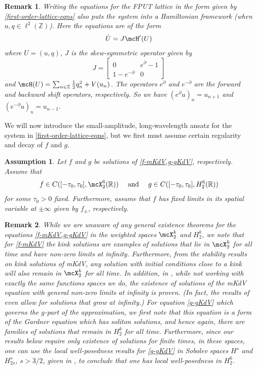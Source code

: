 \documentclass[oneside,reqno]{amsart}
\newcommand{\Z}{\mathbb{Z}}
\newcommand{\R}{\mathbb{R}}
\newtheorem{assum}{Assumption}
\newtheorem{rem}{Remark}
\begin{document}
\begin{rem}
	Writing the equations for the FPUT lattice in the form given by \cref{first-order-lattice-eqns} also puts the system into a Hamiltonian framework (when \(u, q\in\ell^2(\Z)\)). Here the equations are of the form
	\begin{equation*}
		\dot U = J \mcH'(U)
	\end{equation*}
	where \(U = (u,q)\), \(J\) is the skew-symmetric operator given by
	\begin{equation*}
		J = \begin{bmatrix}
			0 & e^\partial - 1 \\ 1 - e^{-\partial} & 0
		\end{bmatrix}
	\end{equation*}
	and \(\mcH(U) = \sum_{n\in\Z} \frac 1 2 q_n^2 + V(u_n)\). The operators \(e^\partial\) and \(e^{-\partial}\) are the forward and backward shift operators, respectively. So we have \((e^\partial u)_n = u_{n+1}\) and \((e^{-\partial}u)_n = u_{n-1}\).
\end{rem}

We will now introduce the small-amplitude, long-wavelength ansatz for the system in \cref{first-order-lattice-eqns}, but we first must assume certain regularity and decay of \(f\) and \(g\).
\begin{assum}\label{assumption-1}
	Let \(f\) and \(g\) be solutions of \cref{f-mKdV,g-gKdV}, respectively. Assume that \[f\in C([-\tau_0, \tau_0], \mcX_2^6(\R)) \quad \text{ and } \quad g\in C([-\tau_0,\tau_0],H_2^6(\R))\] for some \(\tau_0>0\) fixed. Furthermore, assume that \(f\) has fixed limits in its spatial variable at \(\pm \infty\) given by \(f_{\pm}\), respectively.
\end{assum}

\begin{rem}  While we are unaware of any general existence theorems for the equations \cref{f-mKdV,g-gKdV}
	in the weighted spaces $\mcX^k_2$ and $H^k_2$, we note that for \cref{f-mKdV} the kink solutions are examples of solutions that lie in $\mcX^k_2$ for all time and have non-zero limits at infinity.  Furthermore, from the stability results on kink solutions of mKdV, any solution with initial  conditions close to a kink will also remain in $\mcX^k_2$ for all time.  In addition, in \cite{Kappeler:2008}, while not working with exactly the same functions spaces we do,  the existence of  solutions of the mKdV equation with general non-zero limits at infinity is proven.  (In fact, the results of \cite{Kappeler:2008} even allow for solutions that grow at infinity.)  For equation \cref{g-gKdV} which governs the $g$-part of the approximation, we first note that this equation is a form of the Gardner equation which has soliton solutions, and hence again, there are families of solutions that remain in $H^k_2$ for all time.  Furthermore, since our results below require only existence of solutions for finite times, in these spaces, one can use the local well-posedness results for \cref{g-gKdV} in Sobolev spaces $H^s$ and $H^s_{2s}$, $s>3/2$,  given in \cite{Kato:1983}, to conclude that one has local well-posedness in $H^6_2$.
\end{rem}
\end{document}
